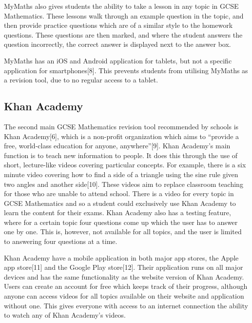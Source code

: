 \documentclass{article}
\begin{document}
MyMaths also gives students the ability to take a lesson in any topic in GCSE Mathematics. These lessons walk through an example question in the topic, and then provide practice questions which are of a similar style to the homework questions. These questions are then marked, and where the student answers the question incorrectly, the correct answer is displayed next to the answer box. \par

MyMaths has an iOS and Android application for tablets, but not a specific application for smartphones[8]. This prevents students from utilising MyMaths as a revision tool, due to no regular access to a tablet. \par

\subsection{Khan Academy}

The second main GCSE Mathematics revision tool recommended by schools is Khan Academy[6], which is a non-profit organization which aims to ``provide a free, world-class education for anyone, anywhere''[9]. Khan Academy's main function is to teach new information to people. It does this through the use of short, lecture-like videos covering particular concepts. For example, there is a six minute video covering how to find a side of a triangle using the sine rule given two angles and another side[10]. These videos aim to replace classroom teaching for those who are unable to attend school. There is a video for every topic in GCSE Mathematics and so a student could exclusively use Khan Academy to learn the content for their exams. Khan Academy also has a testing feature, where for a certain topic four questions come up which the user has to answer one by one. This is, however, not available for all topics, and the user is limited to answering four questions at a time. \par

Khan Academy have a mobile application in both major app stores, the Apple app store[11] and the Google Play store[12]. Their application runs on all major devices and has the same functionality as the website version of Khan Academy. Users can create an account for free which keeps track of their progress, although anyone can access videos for all topics available on their website and application without one. This gives everyone with access to an internet connection the ability to watch any of Khan Academy's videos. \par
\end{document}
